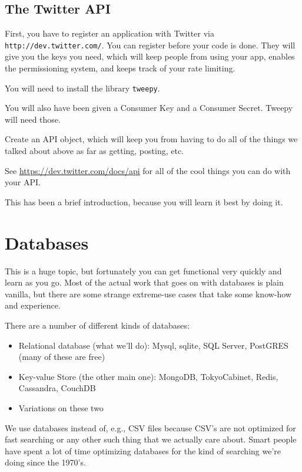 \documentclass[12pt,letter]{article}
\begin{document}
\subsection{The Twitter API}

First, you have to register an application with Twitter via
\texttt{http://dev.twitter.com/}. You can register before your code is done. They will give you the
keys you need, which will keep people from using your app, enables the
permissioning system, and keeps track of your rate limiting. 

You will need to install the library \texttt{tweepy}. 

You will also have been given a Consumer Key and a Consumer
Secret. Tweepy will need those. 

Create an API object, which will keep you from having to do all of the
things we talked about above as far as getting, posting, etc. 

See \url{https://dev.twitter.com/docs/api} for all of the cool things
you can do with your API.


This has been a brief introduction, because you will learn it best by
doing it. 

\section{Databases}
This is a huge topic, but fortunately you can get functional very
quickly and learn as you go. Most of the actual work that goes on with
databases is plain vanilla, but there are some strange extreme-use
cases that take some know-how and experience. 

There are a number of different kinds of databases:
\begin{itemize}
\item Relational database (what we'll do): Mysql, sqlite, SQL Server,
  PostGRES (many of these are free) 
\item Key-value Store (the other main one): MongoDB, TokyoCabinet,
  Redis, Cassandra, CouchDB
\item Variations on these two 
\end{itemize}

We use databases instead of, e.g., CSV files because CSV's are not
optimized for fast searching or any other such thing that we
actually care about. Smart people have spent a lot of time optimizing databases
for the kind of searching we're doing since the 1970's. 
\end{document}
